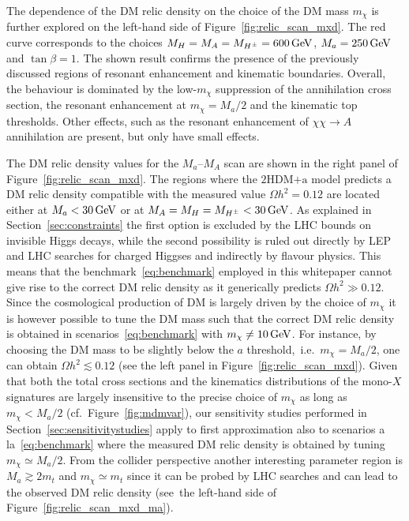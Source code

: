 \documentclass[a4paper, 11pt,notoc]{article}
\newcommand{\mA}{\ensuremath{M_{A}}\xspace}
\newcommand{\ma}{\ensuremath{M_{a}}\xspace}
\newcommand{\mH}{\ensuremath{M_{H}}\xspace}
\newcommand{\mHc}{\ensuremath{M_{H^{\pm}}}\xspace}
\newcommand{\hdma}{\ensuremath{\textrm{2HDM+a}}\xspace}
\begin{document}
The dependence of the DM relic density on the choice of the DM mass $m_\chi$ is further explored on the  left-hand side  of Figure~\ref{fig:relic_scan_mxd}. {\color{red} The red curve corresponds to the choices $\mH=\mA=\mHc= 600 \, {\rm GeV}$, $\ma =250 \, {\rm GeV}$ and $\tan \beta=1$.} The shown result confirms the presence of the previously discussed regions of resonant enhancement and  kinematic boundaries. Overall, the behaviour is dominated by the low-$m_\chi$ suppression of the annihilation cross section, the resonant enhancement at $m_\chi = \ma/2$ and the kinematic top thresholds. Other effects, such as the resonant enhancement of $\chi\chi \to A$ annihilation are present, but only have small effects. 

{\color{red} The DM relic density values for the $\ma$--$\mA$ scan  are shown in the right panel of Figure~\ref{fig:relic_scan_mxd}. The regions where the \hdma model predicts a DM relic density compatible with the measured value $\Omega h^{2} = 0.12$ are located either at $\ma < 30 \, {\rm GeV}$ or at $\mA=\mH=\mHc < 30 \, {\rm GeV}$.} As explained in Section~\ref{sec:constraints} the first option is excluded by the LHC bounds on invisible Higgs decays, while the second possibility is ruled out directly by LEP and LHC searches for charged Higgses and indirectly by flavour physics. This means that the benchmark~\eqref{eq:benchmark} employed in this whitepaper cannot give rise to the correct DM relic density as it generically predicts $\Omega h^{2} \gg 0.12$.  Since the cosmological production of DM is largely driven by the choice of $m_\chi$ it is however possible to tune the DM mass such that the correct DM relic density is obtained in scenarios~\eqref{eq:benchmark} with $m_\chi \neq 10 \, {\rm GeV}$. {\color{red} For instance, by choosing the DM mass to be slightly below the $a$ threshold,~i.e.~$m_\chi = \ma/2$, one can obtain $\Omega h^{2} \lesssim 0.12$ (see the left panel in Figure~\ref{fig:relic_scan_mxd}). Given that both the total cross sections and the kinematics distributions of the mono-$X$ signatures are largely insensitive to the precise choice of $m_\chi$ as long as $m_\chi < \ma/2$ (cf.~Figure~\ref{fig:mdmvar}), our sensitivity studies performed in Section~\ref{sec:sensitivitystudies} apply to first approximation also to scenarios a la~\eqref{eq:benchmark} where the measured DM relic density is obtained by tuning $ m_\chi \simeq \ma/2$.} {\color{magenta} From the collider perspective another interesting parameter region is $M_a \gtrsim  2 m_t$ and $m_\chi \simeq m_t$ since it can be probed by LHC searches and can lead to the observed DM relic density (see~the left-hand side of Figure~\ref{fig:relic_scan_mxd_ma}).  } 
\end{document}
